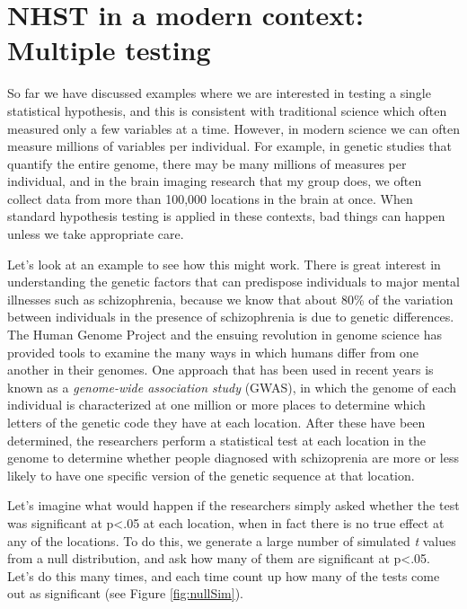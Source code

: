 \documentclass[12pt,]{book}
\theoremstyle{definition}
\theoremstyle{definition}
\theoremstyle{definition}
\theoremstyle{remark}
\begin{document}
\hypertarget{nhst-in-a-modern-context-multiple-testing}{%
\section{NHST in a modern context: Multiple testing}\label{nhst-in-a-modern-context-multiple-testing}}

So far we have discussed examples where we are interested in testing a single statistical hypothesis, and this is consistent with traditional science which often measured only a few variables at a time. However, in modern science we can often measure millions of variables per individual. For example, in genetic studies that quantify the entire genome, there may be many millions of measures per individual, and in the brain imaging research that my group does, we often collect data from more than 100,000 locations in the brain at once. When standard hypothesis testing is applied in these contexts, bad things can happen unless we take appropriate care.

Let's look at an example to see how this might work. There is great interest in understanding the genetic factors that can predispose individuals to major mental illnesses such as schizophrenia, because we know that about 80\% of the variation between individuals in the presence of schizophrenia is due to genetic differences. The Human Genome Project and the ensuing revolution in genome science has provided tools to examine the many ways in which humans differ from one another in their genomes. One approach that has been used in recent years is known as a \emph{genome-wide association study} (GWAS), in which the genome of each individual is characterized at one million or more places to determine which letters of the genetic code they have at each location. After these have been determined, the researchers perform a statistical test at each location in the genome to determine whether people diagnosed with schizoprenia are more or less likely to have one specific version of the genetic sequence at that location.

Let's imagine what would happen if the researchers simply asked whether the test was significant at p\textless{}.05 at each location, when in fact there is no true effect at any of the locations. To do this, we generate a large number of simulated \emph{t} values from a null distribution, and ask how many of them are significant at p\textless{}.05. Let's do this many times, and each time count up how many of the tests come out as significant (see Figure \ref{fig:nullSim}).
\end{document}
